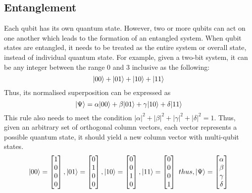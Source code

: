 \documentclass[12pt]{third-rep}
\begin{document}
\subsection{Entanglement}
Each qubit has its own quantum state. However, two or more qubits can act on one another which leads to the formation of an entangled system. When qubit states are entangled, it needs to be treated as the entire system or overall state, instead of individual quantum state. For example, given a two-bit system, it can be any integer between the range 0 and 3 inclusive as the following:
$${\left\vert{00}\right\rangle}+{\left\vert{01}\right\rangle}+{\left\vert{10}\right\rangle}+{\left\vert{11}\right\rangle}$$
Thus, its normalised superposition can be expressed as
$${\left\vert{\Psi}\right\rangle}=\alpha{\left\vert{00}\right\rangle}+\beta{\left\vert{01}\right\rangle}+\gamma{\left\vert{10}\right\rangle}+\delta{\left\vert{11}\right\rangle}$$
This rule also needs to meet the condition $|\alpha|^2+|\beta|^2+|\gamma|^2+|\delta|^2=1$. Thus, given an arbitrary set of orthogonal column vectors, each vector represents a possible quantum state, it should yield a new column vector with multi-qubit states.
\[
{\left\vert{00}\right\rangle}=
\begin{bmatrix}
    1 \\
    0 \\
    0 \\
    0
\end{bmatrix}
,{\left\vert{01}\right\rangle}=
\begin{bmatrix}
    0 \\
    1 \\
    0 \\
    0
\end{bmatrix}
,{\left\vert{10}\right\rangle}=
\begin{bmatrix}
    0 \\
    0 \\
    1 \\
    0
\end{bmatrix}
,{\left\vert{11}\right\rangle}=
\begin{bmatrix}
    0 \\
    0 \\
    0 \\
    1
\end{bmatrix}
\ thus, {\left\vert{\Psi}\right\rangle}=
\begin{bmatrix}
    \alpha \\
    \beta \\
    \gamma \\
    \delta
\end{bmatrix}
\]
\end{document}
